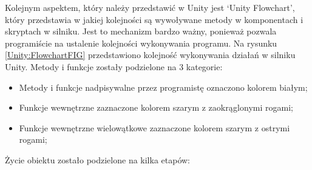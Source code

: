 \documentclass[12pt,twoside]{article}
\begin{document}
Kolejnym aspektem, który należy przedstawić w Unity jest ‘Unity Flowchart’,
który przedstawia w jakiej kolejności są wywoływane metody w komponentach i
skryptach w silniku. Jest to mechanizm bardzo ważny, ponieważ pozwala
programiście na ustalenie kolejności wykonywania programu. Na rysunku
\ref{Unity:FlowchartFIG} przedstawiono kolejność wykonywania działań w silniku
Unity. Metody i funkcje zostały podzielone na 3 kategorie:

\begin{itemize}
    \item Metody i funkcje nadpisywalne przez programistę oznaczono kolorem białym;
    \item Funkcje wewnętrzne zaznaczone kolorem szarym z zaokrąglonymi rogami;
    \item Funkcje wewnętrzne wielowątkowe zaznaczone kolorem szarym z ostrymi
    rogami;
\end{itemize}
Życie obiektu zostało podzielone na kilka etapów:
\end{document}
